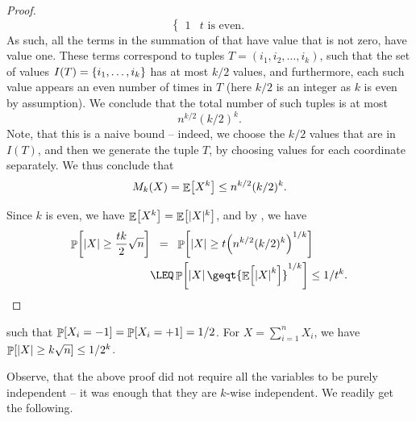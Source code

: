 \begin{proof}
\[\begin{cases}
            1 & t \text{ is even.}
        \end{cases}
    \]
    As such, all the terms in the summation of  that have
    value that is not zero, have value one. These terms correspond to
    tuples $T = (i_1, i_2, \ldots, i_k)$, such that the set of values
    $I(T) = \left\{ { i_1, \ldots, i_k} \right\}$ has at most $k/2$ values, and
    furthermore, each such value appears an even number of times in
    $T$ (here $k/2$ is an integer as $k$ is even by assumption). We
    conclude that the total number of such tuples is at most
    \[
        n^{k/2} (k/2)^k.
    \]
    Note, that this is a naive bound -- indeed, we choose the $k/2$
    values that are in $I(T)$, and then we generate the tuple $T$, by
    choosing values for each coordinate separately. We thus conclude
    that
    \begin{equation*}
        M_k(X) = \Ex{  X^{k}}%
        \leq n^{k/2} (k/2)^k.
    \end{equation*}

    Since $k$ is even, we have $\mathop{\mathbb{E}}\!\left[ {X^k} \right] = \mathop{\mathbb{E}}\!\left[ {|X|^k} \right]$, and by
    , we have
    \begin{align*}
        \Prob{\cardin{X} \geq \frac{tk}{2} \sqrt{n}}%
        &\EQ%
        \Prob{\cardin{X} \geq t \pth{n^{k/2} (k/2)^k}^{1/k}}
        \\&
        \LEQ%
        \Prob{ \cardin{X} \geq%
           t {\Ex{ \bigl. {\cardin{X}}^k} }^{1/k}} \leq {1}/{t^k}.
    \end{align*}
\end{proof}


\begin{corollary}
     such that
    $\Prob{X_i=-1} = \Prob{X_i =+1} = 1/2$. For
    $X = \sum_{i=1}^n X_i$, we have
    $\Prob{|X| \geq k \sqrt{n}} \leq 1/2^k$.
\end{corollary}

Observe, that the above proof did not require all the variables to be
purely independent -- it was enough that they are $k$-wise
independent. We readily get the following.

